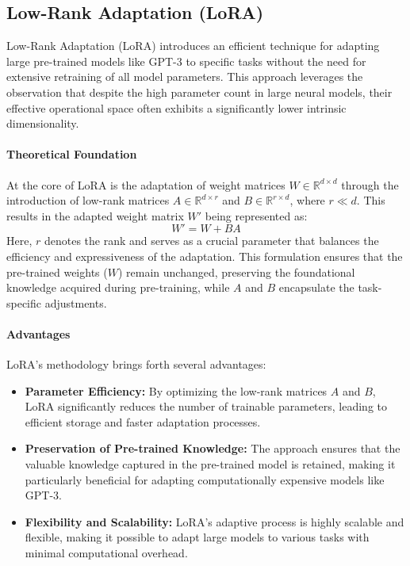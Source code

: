     \subsection{Low-Rank Adaptation (LoRA)}
        Low-Rank Adaptation (LoRA) introduces an efficient technique for adapting large pre-trained models like GPT-3 to specific tasks without the need for extensive retraining of all model parameters. This approach leverages the observation that despite the high parameter count in large neural models, their effective operational space often exhibits a significantly lower intrinsic dimensionality.

        \paragraph{Theoretical Foundation}
        At the core of LoRA is the adaptation of weight matrices \(W \in \mathbb{R}^{d \times d}\) through the introduction of low-rank matrices \(A \in \mathbb{R}^{d \times r}\) and \(B \in \mathbb{R}^{r \times d}\), where \(r \ll d\). This results in the adapted weight matrix \(W'\) being represented as:
        \begin{equation}
            W' = W + BA
        \end{equation}
        Here, \(r\) denotes the rank and serves as a crucial parameter that balances the efficiency and expressiveness of the adaptation. This formulation ensures that the pre-trained weights (\(W\)) remain unchanged, preserving the foundational knowledge acquired during pre-training, while \(A\) and \(B\) encapsulate the task-specific adjustments.

        \paragraph{Advantages}
        LoRA's methodology brings forth several advantages:
        \begin{itemize}
            \item \textbf{Parameter Efficiency:} By optimizing the low-rank matrices \(A\) and \(B\), LoRA significantly reduces the number of trainable parameters, leading to efficient storage and faster adaptation processes.
            \item \textbf{Preservation of Pre-trained Knowledge:} The approach ensures that the valuable knowledge captured in the pre-trained model is retained, making it particularly beneficial for adapting computationally expensive models like GPT-3.
            \item \textbf{Flexibility and Scalability:} LoRA's adaptive process is highly scalable and flexible, making it possible to adapt large models to various tasks with minimal computational overhead.
        \end{itemize}

